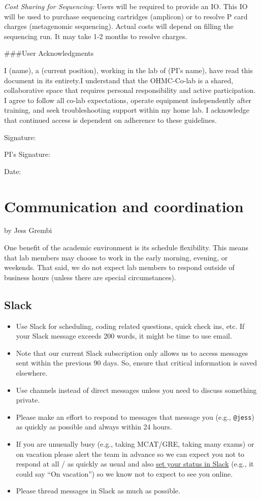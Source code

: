 \documentclass[
]{book}
\providecommand{\tightlist}{%
  \setlength{\itemsep}{0pt}\setlength{\parskip}{0pt}}
\begin{document}
\emph{Cost Sharing for Sequencing:} Users will be required to provide an IO. This IO will be used to purchase sequencing cartridges (amplicon) or to resolve P card charges (metagenomic sequencing). Actual costs will depend on filling the sequencing run. It may take 1-2 months to resolve charges.

\#\#\#User Acknowledgments

I (name), a (current position), working in the lab of (PI's name), have read this document in its entirety.I understand that the OHMC-Co-lab is a shared, collaborative space that requires personal responsibility and active participation. I agree to follow all co-lab expectations, operate equipment independently after training,
and seek troubleshooting support within my home lab. I acknowledge that continued access is dependent on adherence to these guidelines.

Signature:

PI's Signature:

Date:

\chapter{Communication and coordination}\label{communication-and-coordination}

by Jess Grembi

One benefit of the academic environment is its schedule flexibility. This means that lab members may choose to work in the early morning, evening, or weekends. That said, we do not expect lab members to respond outside of business hours (unless there are special circumstances).

\section{Slack}\label{slack}

\begin{itemize}
\tightlist
\item
  Use Slack for scheduling, coding related questions, quick check ins, etc. If your Slack message exceeds 200 words, it might be time to use email.
\item
  Note that our current Slack subscription only allows us to access messages sent within the previous 90 days. So, ensure that critical information is saved elsewhere.
\item
  Use channels instead of direct messages unless you need to discuss something private.
\item
  Please make an effort to respond to messages that message you (e.g., \texttt{@jess}) as quickly as possible and always within 24 hours.
\item
  If you are unusually busy (e.g., taking MCAT/GRE, taking many exams) or on vacation please alert the team in advance so we can expect you not to respond at all / as quickly as usual and also \href{https://get.slack.help/hc/en-us/articles/201864558-Set-your-Slack-status-and-availability}{set your status in Slack} (e.g., it could say ``On vacation'') so we know not to expect to see you online.
\item
  Please thread messages in Slack as much as possible.
\end{itemize}
\end{document}
